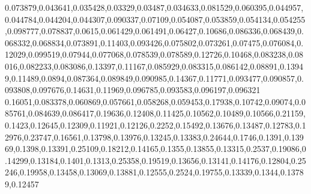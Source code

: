 0.073879,0.043641,0.035428,0.03329,0.03487,0.034633,0.081529,0.060395,0.044957,0.044784,0.044204,0.044307,0.090337,0.07109,0.054087,0.053859,0.054134,0.054255,0.098777,0.078837,0.0615,0.061429,0.061491,0.06427,0.10686,0.086336,0.068439,0.068332,0.068834,0.073891,0.11403,0.093426,0.075802,0.073261,0.07475,0.076084,0.12029,0.099519,0.07944,0.077068,0.078539,0.078589,0.12726,0.10468,0.083238,0.08016,0.082233,0.083086,0.13397,0.11167,0.085929,0.083315,0.086142,0.08891,0.13949,0.11489,0.0894,0.087364,0.089849,0.090985,0.14367,0.11771,0.093477,0.090857,0.093808,0.097676,0.14631,0.11969,0.096785,0.093583,0.096197,0.096321
0.16051,0.083378,0.060869,0.057661,0.058268,0.059453,0.17938,0.10742,0.09074,0.085761,0.084639,0.086417,0.19636,0.12408,0.11425,0.10562,0.10489,0.10566,0.21159,0.1423,0.12645,0.12309,0.11921,0.12126,0.2252,0.15492,0.13676,0.13487,0.12783,0.12976,0.23747,0.16561,0.13798,0.13976,0.13245,0.13383,0.24644,0.1746,0.1391,0.13969,0.1398,0.13391,0.25109,0.18212,0.14165,0.1355,0.13855,0.13315,0.2537,0.19086,0.14299,0.13184,0.1401,0.1313,0.25358,0.19519,0.13656,0.13141,0.14176,0.12804,0.25246,0.19958,0.13458,0.13069,0.13881,0.12555,0.2524,0.19755,0.13339,0.1344,0.13789,0.12457
